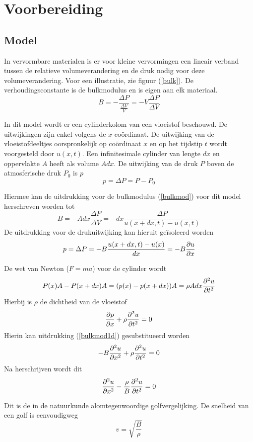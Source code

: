 \section{Voorbereiding}
\subsection{Model}

In vervormbare materialen is er voor kleine vervormingen een lineair verband 
tussen de relatieve volumeverandering en de druk nodig voor deze 
volumeverandering. Voor een illustratie, zie figuur (\ref{bulk}). De 
verhoudingsconstante is de bulkmodulus en is eigen aan elk materiaal.
\begin{equation}
\label{bulkmod}
B = -\frac{\Delta P}{\frac{\Delta V}{V}} = - V \frac{\Delta P}{\Delta V}
\end{equation}

In dit model wordt er een cylinderkolom van een vloeistof beschouwd. De 
uitwijkingen zijn enkel volgens de $x$-co\"ordinaat. De uitwijking van de 
vloeistofdeeltjes oorspronkelijk op co\"ordinaat $x$ en op het tijdstip $t$ 
wordt voorgesteld door $u(x,t)$. Een infinitesimale cylinder van lengte $dx$ en 
oppervlakte $A$ heeft als volume $A dx$.  De uitwijking van de druk $P$ boven 
de atmosferische druk $P_0$ is $p$
$$
p = \Delta P = P - P_0
$$

Hiermee kan de uitdrukking voor de bulkmodulus (\ref{bulkmod}) voor dit model 
herschreven worden tot
$$
B = -A dx \frac{\Delta P}{\Delta V} = -dx \frac{\Delta P}{ u(x+dx,t)-u(x,t)}
$$
De uitdrukking voor de drukuitwijking kan hieruit ge\"isoleerd worden
\begin{equation}
\label{bulkmod1d}
p = \Delta P = -B \frac{u(x+dx,t)-u(x)}{dx} = -B \frac{\partial u}{\partial x}
\end{equation}

De wet van Newton ($F = ma$) voor de cylinder wordt
$$
P(x)A - P(x+dx)A = (p(x) - p(x+dx))A = \rho A dx \frac{\partial^2 u}{\partial t^2}
$$
Hierbij is $\rho$ de dichtheid van de vloeistof
$$
\frac{\partial p}{\partial x} + \rho \frac{\partial^2 u}{\partial t^2} = 0
$$
Hierin kan uitdrukking (\ref{bulkmod1d}) gesubstitueerd worden
$$
-B\frac{\partial^2 u}{\partial x^2} + \rho \frac{\partial^2 u}{\partial t^2} = 0
$$
Na herschrijven wordt dit
\begin{equation}
\label{waveeq}
\frac{\partial^2 u}{\partial x^2} - \frac{\rho}{B} \frac{\partial^2 u}{\partial t^2} = 0
\end{equation}

Dit is de in de natuurkunde alomtegenwoordige golfvergelijking. De snelheid van 
een golf is eenvoudigweg
\begin{equation}
\label{speedofsound}
v = \sqrt{\frac{B}{\rho}}
\end{equation}

